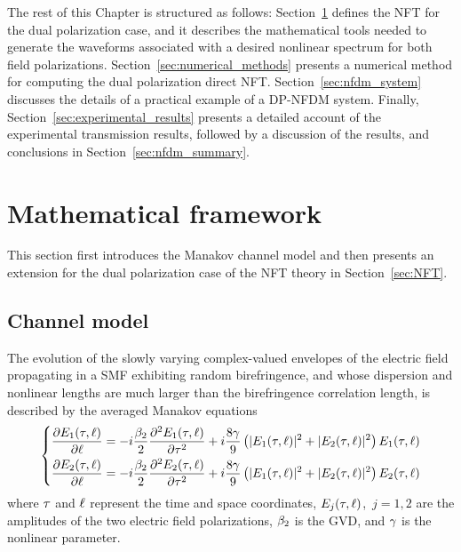 The rest of this Chapter is structured as follows:
Section~\ref{sec:math_framework} defines the \ac{NFT} for the dual polarization
case, and it describes the mathematical tools needed to generate the waveforms
associated with a desired nonlinear spectrum for both field polarizations.
Section~\ref{sec:numerical_methods} presents a numerical method for computing
the dual polarization direct \ac{NFT}. Section~\ref{sec:nfdm_system} discusses
the details of a practical example of a \ac{DP-NFDM} system. Finally,
Section~\ref{sec:experimental_results} presents a detailed account of the
experimental transmission results, followed by a discussion of the results, and
conclusions in Section~\ref{sec:nfdm_summary}.


\section{Mathematical framework}\label{sec:math_framework}

This section first introduces the Manakov channel model and then presents an extension for  the dual polarization case of the \ac{NFT} theory in Section~\ref{sec:NFT}.


\subsection{Channel model}

The evolution of the slowly varying complex-valued envelopes of the electric field propagating in a \ac{SMF} exhibiting random birefringence, and whose dispersion and nonlinear lengths are much larger than the birefringence correlation length, is described by the averaged Manakov equations~\cite{Wai1991a,menyuk2006interaction}
\begin{equation}\label{eq:MS}
  \left\{\begin{aligned}
    \pdv{\fld[1](\ttm,\ssp)}{\ssp}&=- \iunit\dfrac{\dispersion}{2}\pdv[2]{\fld[1](\ttm,\ssp)}{\ttm}+\iunit\frac{8\nonlinfact}{9}\left(|\fld[1](\ttm,\ssp)|^2+|\fld[2](\ttm,\ssp)|^2\right)\fld[1](\ttm,\ssp)\\
    \pdv{\fld[2](\ttm,\ssp)}{\ssp}&=- \iunit\dfrac{\dispersion}{2}\pdv[2]{\fld[2](\ttm,\ssp)}{\ttm}+\iunit\frac{8\nonlinfact}{9}\left(|\fld[1](\ttm,\ssp)|^2+|\fld[2](\ttm,\ssp)|^2\right)\fld[2](\ttm,\ssp)
  \end{aligned}\right.
\end{equation}
where $\ttm$ and $\ssp$ represent the time and space coordinates, \mbox{$\fld[j](\ttm,\ssp)$, $j = 1,2$} are the amplitudes of the two electric field polarizations, $\dispersion$ is the \ac{GVD}, and $\nonlinfact$ is the nonlinear parameter.

